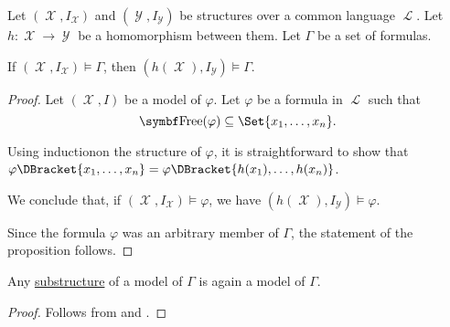 \begin{proposition}\label{thm:first_order_homomorphism_preserves_models}
  Let \( (\mscrX, I_{\mscrX}) \) and \( (\mscrY, I_{\mscrY}) \) be structures over a common language \( \mscrL \). Let \( h: \mscrX \to \mscrY \) be a homomorphism between them. Let \( \Gamma \) be a set of formulas.

  If \( (\mscrX, I_{\mscrX}) \models \Gamma \), then \( (h(\mscrX), I_{\mscrY}) \models \Gamma \).
\end{proposition}
\begin{proof}
  Let \( (\mscrX, I) \) be a model of \( \varphi \). Let \( \varphi \) be a formula in \( \mscrL \) such that
  \begin{equation*}
    \Bold{Free}(\varphi) \subseteq \Set{x_1, \ldots, x_n}.
  \end{equation*}

  Using induction\IND on the structure of \( \varphi \), it is straightforward to show that \( \varphi\DBracket{x_1, \ldots, x_n} = \varphi\DBracket{h(x_1), \ldots, h(x_n)} \).

  We conclude that, if \( (\mscrX, I_{\mscrX}) \models \varphi \), we have \( (h(\mscrX), I_{\mscrY}) \models \varphi \).

  Since the formula \( \varphi \) was an arbitrary member of \( \Gamma \), the statement of the proposition follows.
\end{proof}

\begin{corollary}\label{thm:substructure_is_model}
  Any \hyperref[def:first_order_substructure]{substructure} of a model of \( \Gamma \) is again a model of \( \Gamma \).
\end{corollary}
\begin{proof}
  Follows from  and .
\end{proof}

\begin{remark}\label{rem:induction}
\end{remark}

\begin{definition}\label{def:first_order_model_category}
\end{definition}
